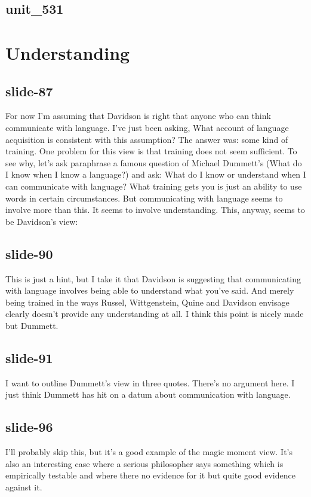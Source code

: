 \documentclass[12pt,\papersize]{extarticle}
\begin{document}
 
\subsection{unit\_531}
 
\section{Understanding}
 
 
\subsection{slide-87}
For now I'm assuming that Davidson is right that anyone who can think communicate with language.
I've just been asking, What account of language acquisition is consistent with this assumption?
The answer was: some kind of training.
One problem for this view is that training does not seem sufficient.
To see why, let's ask paraphrase a famous question of Michael Dummett's (What do I know when I know a language?) and ask:
What do I know or understand when I can communicate with language?
What training gets you is just an ability to use words in certain circumstances.
But communicating with language seems to involve more than this.
It seems to involve understanding.
This, anyway, seems to be Davidson's view:
 
 
\subsection{slide-90}
This is just a hint, but I take it that Davidson is suggesting that communicating with language involves being able to understand what you've said.
And merely being trained in the ways Russel, Wittgenstein, Quine and Davidson envisage clearly doesn't provide any understanding at all.
I think this point is nicely made but Dummett.
 
 
\subsection{slide-91}
I want to outline Dummett's view in three quotes.
There's no argument here. I just think Dummett has hit on a datum about communication with language.
 
 
\subsection{slide-96}
I'll probably skip this, but it's a good example of the magic moment view.
It's also an interesting case where a serious philosopher says something which is empirically testable and where there no evidence for it but quite good evidence against it.
 
\end{document}
